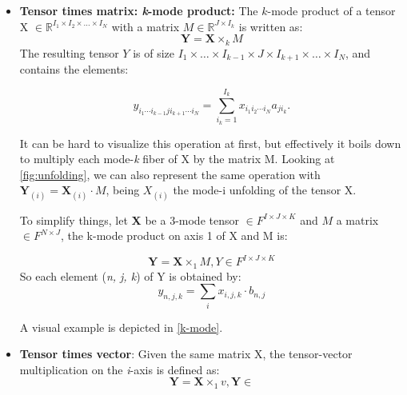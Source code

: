 \begin{itemize}
    \item  \textbf{Tensor times matrix: \textit{k}-mode product:} 
            The $k$-mode product of a tensor X $\in \mathbb{R}^{I_{1} \times I_{2} \times \ldots \times I_{N}}$ with a matrix $M \in \mathbb{R}^{J \times I_{k}}$ is written as: 
           \begin{equation}
                \textbf{Y} = \textbf{X} \times_{k} M
           \end{equation}
            The resulting tensor $Y$ is of size $I_{1} \times \ldots \times I_{k-1} \times J \times I_{k+1} \times \ldots \times I_{N}$, and contains the elements:

            $$ 
             y_{i_{1}  \cdots  i_{k-1}  j  i_{k+1}  \cdots  i_{N}} =   \sum_{i_{k} = 1}^{I_{k}} x_{i_{1}  i_{2}  \cdots  i_{N}} a_{ji_{k}}.
            $$
             
             It can be hard to visualize this operation at first, but effectively it boils down to 
             multiply each mode-\textit{k} fiber of X by the matrix M. Looking at \ref{fig:unfolding}, we can also represent the same operation with 
             $ \textbf{Y}_{(i)} = \textbf{X}_{(i)} \cdot M$, being $X_{(i)}$ the mode-i unfolding of the tensor X. \newline
             
             To simplify things, let \textbf{X} be a 3-mode tensor $\in F^{I \times J \times K}$ and $M$ a matrix $\in F^{N \times J}$, the k-mode product on axis 1 of X and M is:
            
            \begin{equation}
                        \textbf{Y} = \textbf{X} \times_{1} M, Y \in F^{I \times J \times K} 
            \end{equation}
            So each element (\textit{n, j, k}) of Y is obtained by: 
            \begin{equation}
                y_{n,j,k} = \sum_{i} x_{i,j,k}  \cdot  b_{n,j}  
            \end{equation}
            
            A visual example is depicted in \ref{k-mode}.

    
    \item \textbf{Tensor times vector}: 
       Given the same matrix X, the tensor-vector multiplication on the \textit{i}-axis is defined as:
       \begin{equation}
           \textbf{Y} = \textbf{X} \times_1 v, \textbf{Y} \in \mathbb{}
       \end{equation}


\end{itemize}
